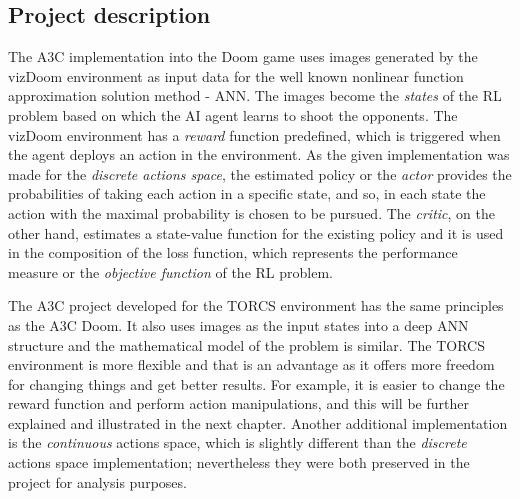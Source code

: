 \subsection{Project description}
The A3C implementation into the Doom game uses images generated by the vizDoom environment as input data for the well known nonlinear function approximation solution method - ANN. The images become the \textit{states} of the RL problem based on which the AI agent learns to shoot the opponents. The vizDoom environment has a \textit{reward} function predefined, which is triggered when the agent deploys an action in the environment. As the given implementation was made for the \textit{discrete actions space}, the estimated policy or the \textit{actor} provides the probabilities of taking each action in a specific state, and so, in each state the action with the maximal probability is chosen to be pursued. The \textit{critic}, on the other hand, estimates a state-value function for the existing policy and it is used in the composition of the loss function, which represents the performance measure or the \textit{objective function} of the RL problem.

The A3C project developed for the TORCS environment has the same principles as the A3C Doom. It also uses images as the input states into a deep ANN structure and the mathematical model of the problem is similar. The TORCS environment is more flexible and that is an advantage as it offers more freedom for changing things and get better results. For example, it is easier to change the reward function and perform action manipulations, and this will be further explained and illustrated in the next chapter. Another additional implementation is the \textit{continuous} actions space, which is slightly different than the \textit{discrete} actions space implementation; nevertheless they were both preserved in the project for analysis purposes. 

